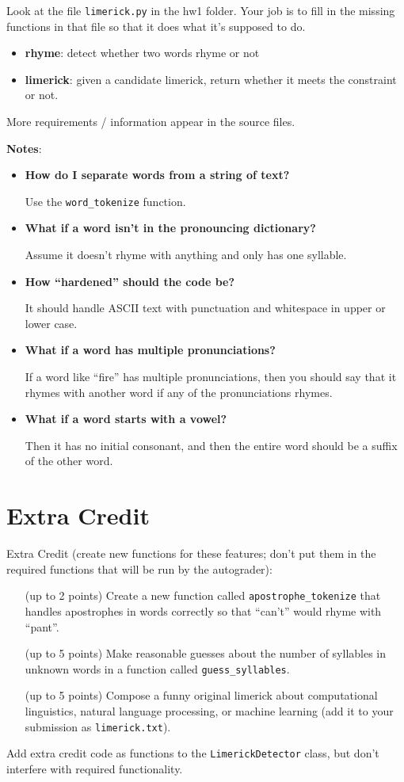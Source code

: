 \documentclass[11pt]{article}
\begin{document}
Look at the file \texttt{limerick.py} in the hw1 folder.  Your job is to fill
in the missing functions in that file so that it does what it’s
supposed to do.
\begin{itemize}
\item {\bf rhyme}: detect whether two words rhyme or not
\item {\bf limerick}: given a candidate limerick, return whether it meets the
constraint or not.
\end{itemize}
More requirements / information appear in the source files.

\clearpage

\noindent \textbf{Notes}:
\begin{itemize}
\item {\bf How do I separate words from a string of text?}

Use the \texttt{word\_tokenize} function.

\item {\bf What if a word isn’t in the pronouncing dictionary?}

Assume it doesn’t rhyme with anything and only has one syllable.

\item {\bf How ``hardened'' should the code be?}

It should handle ASCII text with punctuation and whitespace in upper or lower case.

\item {\bf What if a word has multiple pronunciations?}

If a word like “fire” has multiple pronunciations, then you should say
that it rhymes with another word if any of the pronunciations rhymes.

\item {\bf What if a word starts with a vowel?}

Then it has no initial consonant, and then the entire word should be a
suffix of the other word.
\end{itemize}

\section*{Extra Credit}

Extra Credit (create new functions for these features; don’t put them
in the required functions that will be run by the autograder):
\begin{itemize}
\item[(up to 2 points)] Create a new function called
  \texttt{apostrophe\_tokenize} that handles apostrophes in words correctly so
  that ``can’t'' would rhyme with ``pant''.
\item[(up to 5 points)] Make reasonable guesses about the number of syllables in unknown words in a function called \texttt{guess\_syllables}.
\item[(up to 5 points)] Compose a funny original limerick about
  computational linguistics, natural language processing, or machine
  learning (add it to your submission as \texttt{limerick.txt}).
\end{itemize}
Add extra credit code as functions to the \texttt{LimerickDetector}
class, but don't interfere with required functionality.
\end{document}
